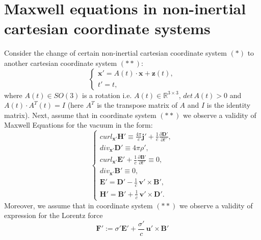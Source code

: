 \documentclass{article}
\theoremstyle{definition}
\theoremstyle{remark}
\renewcommand{\vec}[1]{\mathbf{#1}}
\newcommand{\R}{\mathbb{R}}
\newcommand{\R}{{\mathbb{R}}}
\begin{document}
\section{Maxwell equations in non-inertial cartesian coordinate
systems}\label{INNONredPPN}
Consider the change of certain non-inertial cartesian coordinate
system $(*)$ to another cartesian coordinate system $(**)$:
\begin{equation}\label{noninchredPPN}
\begin{cases}
\vec x'=A(t)\cdot \vec x+\vec z(t),\\
t'=t,
\end{cases}
\end{equation}
where $A(t)\in SO(3)$ is a rotation i.e. $A(t)\in \R^{3\times 3}$,
$det\, A(t)>0$ and $A(t)\cdot A^T(t)=I$ (here $A^T$ is the transpose
matrix of $A$ and $I$ is the identity matrix). Next, assume that in
coordinate system $(**)$ we observe a validity of Maxwell Equations
for the vacuum in the form:
\begin{equation}\label{MaxVacFull1ninshtrredPPN}
\begin{cases}
curl_{\vec x'} \vec H'\equiv \frac{4\pi}{c}\vec
j'+\frac{1}{c}\frac{\partial
\vec D'}{\partial t'},\\
div_{\vec x'} \vec D'\equiv 4\pi\rho',\\
curl_{\vec x'} \vec E'+\frac{1}{c}\frac{\partial \vec B'}{\partial t'}\equiv 0,\\
div_{\vec x'} \vec B'\equiv 0,\\
\vec E'=\vec D'-\frac{1}{c}\,\vec v'\times \vec B',\\
\vec H'=\vec B'+\frac{1}{c}\,\vec v'\times \vec D'.
\end{cases}
\end{equation}
Moreover, we assume that in coordinate system $(**)$ we observe a
validity of expression for the Lorentz force
\begin{equation}\label{LorenzChredPPN}
\vec F':=\sigma' \vec E'+\frac{\sigma'}{c}\,\vec u'\times \vec B'
\end{equation}
\end{document}
